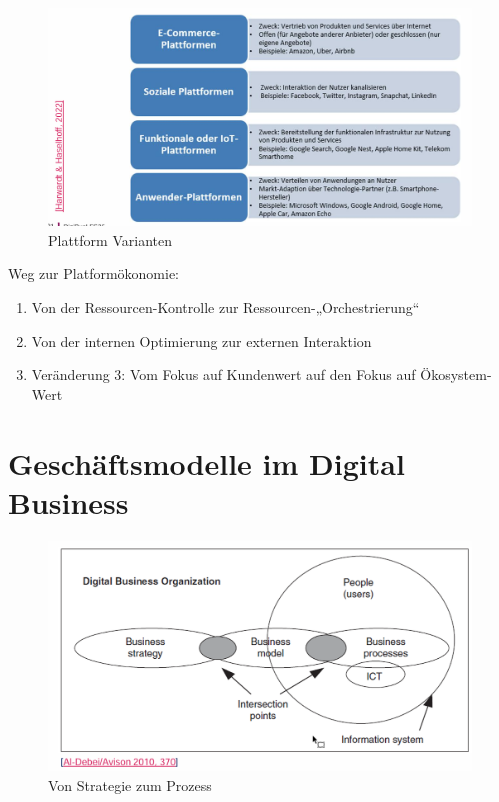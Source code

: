 \documentclass[../Main.tex]{subfiles}
\begin{document}
\begin{figure}[H]
    \centering
    \includegraphics[width=1\linewidth]{Images/digbus/platformvar2.png}
    \caption{Plattform Varianten}
\end{figure}

Weg zur Platformökonomie:
\begin{enumerate}
    \item Von der Ressourcen-Kontrolle zur Ressourcen-„Orchestrierung“
    \item Von der internen Optimierung zur externen Interaktion
    \item Veränderung 3: Vom Fokus auf Kundenwert auf den Fokus auf Ökosystem-Wert
\end{enumerate}


\section{ Geschäftsmodelle im Digital Business}

\begin{figure}[H]
    \centering
    \includegraphics[width=1\linewidth]{Images/digbus/stratproc.png}
    \caption{Von Strategie zum Prozess}
\end{figure}
\end{document}
